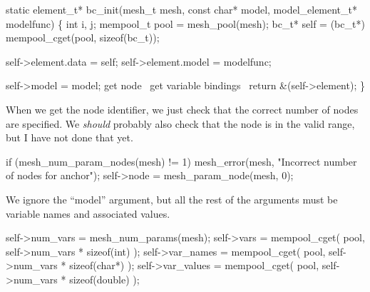 \nwendcode{}\nwdocspar

\nwenddocs{}\endmoddef
static element_t* bc_init(mesh_t mesh, const char* model, 
                          model_element_t* modelfunc)
\{
    int i, j;
    mempool_t pool = mesh_pool(mesh);
    bc_t*     self = (bc_t*) mempool_cget(pool, sizeof(bc_t));

    self->element.data = self;
    self->element.model = modelfunc;

    self->model = model;
    \LA{}get \code{}node\edoc{}~{\nwtagstyle{}}\RA{}
    \LA{}get variable bindings~{\nwtagstyle{}}\RA{}
    return &(self->element);
\}

\nwendcode{}\nwdocspar

When we get the node identifier, we just check that the correct
number of nodes are specified.  We \emph{should} probably also
check that the node is in the valid range, but I have not done
that yet.

\nwenddocs{}\endmoddef
if (mesh_num_param_nodes(mesh) != 1)
    mesh_error(mesh, "Incorrect number of nodes for anchor");
self->node = mesh_param_node(mesh, 0);

\nwendcode{}\nwdocspar

We ignore the ``model'' argument, but all the rest of the arguments
must be variable names and associated values.

\nwenddocs{}\endmoddef
self->num_vars   = mesh_num_params(mesh);
self->vars       = mempool_cget( pool, self->num_vars * sizeof(int)    );
self->var_names  = mempool_cget( pool, self->num_vars * sizeof(char*)  );
self->var_values = mempool_cget( pool, self->num_vars * sizeof(double) );

